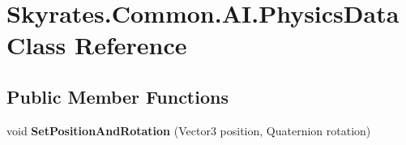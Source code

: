 \hypertarget{class_skyrates_1_1_common_1_1_a_i_1_1_physics_data}{\section{Skyrates.\-Common.\-A\-I.\-Physics\-Data Class Reference}
\label{class_skyrates_1_1_common_1_1_a_i_1_1_physics_data}
}
\subsection*{Public Member Functions}
\begin{DoxyCompactItemize}
\item 
\hypertarget{class_skyrates_1_1_common_1_1_a_i_1_1_physics_data_aa83649b0c60ae9091119d4504580dcf7}{void {\bfseries Set\-Position\-And\-Rotation} (Vector3 position, Quaternion rotation)}\label{class_skyrates_1_1_common_1_1_a_i_1_1_physics_data_aa83649b0c60ae9091119d4504580dcf7}

\end{DoxyCompactItemize}
